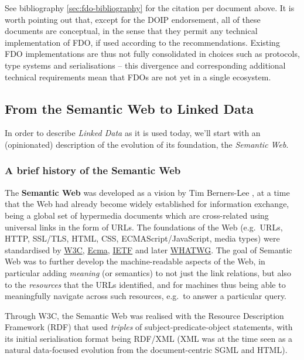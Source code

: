 \documentclass[fleqn,10pt,lineno]{wlpeerjlua}
\begin{document}
See bibliography \vref*{sec:fdo-bibliography} for the citation per document above. It is worth pointing out that, except for the DOIP endorsement, all of these documents are conceptual, in the sense that they permit any technical implementation of FDO, if used according to the recommendations. Existing FDO implementations \autocite{wittenburgFAIRDigitalObject2022b} are thus not fully consolidated in choices such as protocols, type systems and serialisations -- this divergence and corresponding additional technical requirements mean that FDOs are not yet in a single ecosystem. 

\subsection*{From the Semantic Web to Linked Data}\label{sec:ld}

In order to describe \emph{Linked Data} as it is used today, we'll start with an (opinionated) description of the evolution of its foundation, the \emph{Semantic Web}.

\subsubsection*{A brief history of the Semantic Web}\label{sec:semweb}

The \textbf{Semantic Web} was developed as a vision by Tim Berners-Lee \autocite{berners-leeWeavingWebOriginal1999}, at a time that the Web had already become widely established for information exchange, being a global set of hypermedia documents which are cross-related using universal links in the form of URLs. The foundations of the Web (e.g.~URLs, HTTP, SSL/TLS, HTML, CSS, ECMAScript/JavaScript, media types) were standardised by \href{https://www.w3.org/standards/}{W3C}, \href{https://www.ecma-international.org/}{Ecma}, \href{https://www.ietf.org/standards/}{IETF} and later \href{https://whatwg.org/}{WHATWG}. The goal of Semantic Web was to further develop the machine-readable aspects of the Web, in particular adding \emph{meaning} (or semantics) to not just the link relations, but also to the \emph{resources} that the URLs identified, and for machines thus being able to meaningfully navigate across such resources, e.g.~to answer a particular query.

Through W3C, the Semantic Web was realised with the Resource Description Framework (RDF) \autocite{w3-rdf11-primer} that used \emph{triples} of subject-predicate-object statements, with its initial serialisation format \autocite{w3-rdf-syntax99} being RDF/XML (XML was at the time seen as a natural data-focused evolution from the document-centric SGML and HTML).
\end{document}
